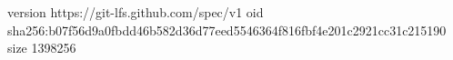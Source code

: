 version https://git-lfs.github.com/spec/v1
oid sha256:b07f56d9a0fbdd46b582d36d77eed5546364f816fbf4e201c2921cc31c215190
size 1398256
